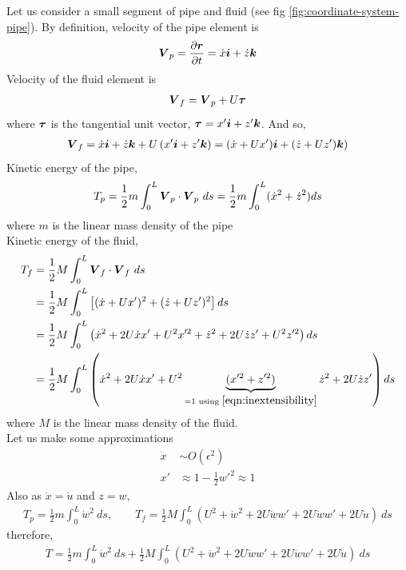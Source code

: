 \documentclass[12pt]{report}
\begin{document}
Let us consider a small segment of pipe and fluid (see fig \ref{fig:coordinate-system-pipe}). By definition, velocity of the pipe element is
\begin{align*}
\vb*{V}_p = \pdv{\vb*{r}}{t} = \dot{x}\vb*{i} + \dot{z}\vb*{k}
\end{align*}
Velocity of the fluid element is 
\begin{align*}
\vb*{V}_f = \vb*{V}_p + U \vb*{\tau}
\end{align*}
where $\vb*{\tau}$ is the tangential unit vector, $\vb*{\tau} = x' \vb*{i} + z'\vb*{k}$. And so, 
\begin{align*}
\vb*{V}_f = \dot{x}\vb*{i} + \dot{z}\vb*{k} + U\left(x' \vb*{i} + z'\vb*{k}\right) = (\dot{x} + Ux')\vb*{i} + (\dot{z} + Uz')\vb*{k})
\end{align*}
Kinetic energy of the pipe, 
$$T_p = \frac{1}{2}m \int_0^L \vb*{V}_p\cdot\vb*{V}_p~ds =  \frac{1}{2}m \int_0^L (\dot{x}^2 + \dot{z}^2) ds$$
where $m$ is the linear mass density of the pipe \\
Kinetic energy of the fluid, 
\begin{align*}
   T_f &=  \frac{1}{2}M \int_0^L \vb*{V}_f\cdot\vb*{V}_f~ds  \\
      & = \frac{1}{2}M \int_0^L \left[ (\dot{x} + Ux')^2 + (\dot{z} + Uz')^2\right] ds  \\
      &= \frac{1}{2}M \int_0^L \left(\dot{x}^2 + 2U\dot{x}x' + U^2x'^2 + \dot{z}^2 + 2U\dot{z}z' + U^2z'^2\right) ds \\
      &= \frac{1}{2}M \int_0^L \left(\dot{x}^2 + 2U\dot{x}x' + U^2\underbrace{(x'^2 + z'^2)}_{= 1 \text{ using } \ref{eqn:inextensibility}} \dot{z}^2 + 2U\dot{z}z'\right) ds
\end{align*}
where $M$ is the linear mass density of the fluid. \\
Let us make some approximations
\begin{align*}
  \dot{x} &\sim O(\epsilon^2) \\
   x' &\approx 1  - \frac{1}{2}w'^2 \approx 1
\end{align*}
Also as $\dot{x} = \dot{u}$ and $z = w$,
\begin{align*}
T_p = \frac{1}{2}m \int_0^L \dot{w}^2~ds, \qquad T_f = \frac{1}{2}M\int_0^L \left(U^2 + \dot{w}^2 + 2U\dot{w}w' + 2U\dot{w}w' + 2U\dot{u}\right)~ds 
\end{align*}
therefore, 
\begin{align}
T = \frac{1}{2}m \int_0^L \dot{w}^2~ds + \frac{1}{2}M\int_0^L \left(U^2 + \dot{w}^2 + 2U\dot{w}w' + 2U\dot{w}w' + 2U\dot{u}\right)~ds \label{eqn:T}
\end{align}
\end{document}
